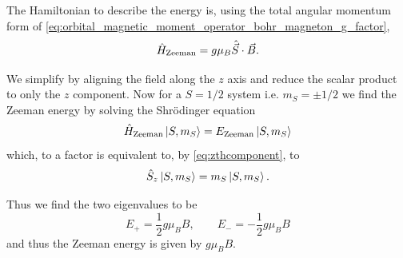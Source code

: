 The Hamiltonian to describe the energy is, using the total angular momentum form of \eqref{eq:orbital_magnetic_moment_operator_bohr_magneton_g_factor}, 
\begin{equation}
    \hat{H}_{\ce{Zeeman}} = g \mu_B \hat{\vec{S}}\cdot\vec{B}. 
    \label{eq:Zeeman_Hamiltonian}
\end{equation}

We simplify by aligning the field along the $z$ axis and reduce the scalar product to only the $z$ component. Now for a $S=1/2$ system i.e. $m_S = \pm 1/2$ we find the Zeeman energy by solving the Shr\"odinger equation 
\begin{equation}
    \hat{H}_{\ce{Zeeman}} \ket{S, m_S} = E_{\ce{Zeeman}}\ket{S, m_S} 
\end{equation}
which, to a factor is equivalent to, by \eqref{eq:zthcomponent}, to
\begin{equation}
    \hat{S}_{z} \ket{S, m_S} = m_S\ket{S, m_S}.
\end{equation}

Thus we find the two eigenvalues to be
\begin{equation}
E_+ =\frac{1}{2}g\mu_BB, \qquad E_-=-\frac{1}{2}g\mu_BB
    \label{eq:zeeman_energy}
\end{equation}
and thus the Zeeman energy is given by $g\mu_B B$. 



%





